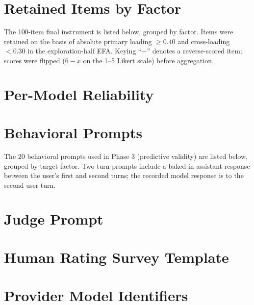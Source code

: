 \documentclass[11pt]{article}
\newcommand{\nretained}{100}
\begin{document}
\section{Retained Items by Factor}
\label{app:loadings}

The \nretained{}-item final instrument is listed below, grouped by factor. Items were retained on the basis of absolute primary loading $\geq 0.40$ and cross-loading $< 0.30$ in the exploration-half EFA. Keying ``$-$'' denotes a reverse-scored item; scores were flipped ($6 - x$ on the 1--5 Likert scale) before aggregation.



\section{Per-Model Reliability}
\label{app:model-reliability}



\section{Behavioral Prompts}
\label{app:behavioral-prompts}

The 20 behavioral prompts used in Phase 3 (predictive validity) are listed below, grouped by target factor. Two-turn prompts include a baked-in assistant response between the user's first and second turns; the recorded model response is to the second user turn.



\section{Judge Prompt}
\label{app:judge-prompt}



\section{Human Rating Survey Template}
\label{app:survey-template}



\section{Provider Model Identifiers}
\label{app:model-registry}
\end{document}
